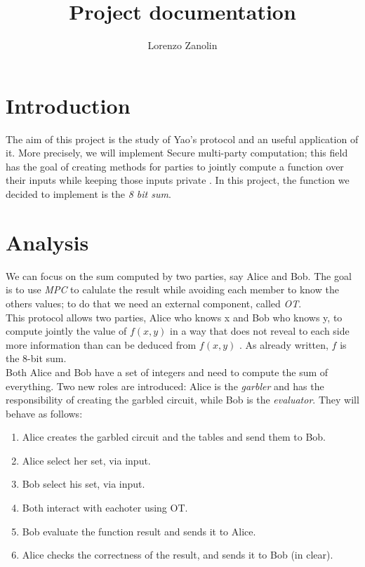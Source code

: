 \documentclass[12pt]{article}
\title{Project documentation}
\author{Lorenzo Zanolin}
\begin{document}
\maketitle

\section{Introduction}
The aim of this project is the study of Yao's protocol \cite{yao} and an useful application of it. More precisely, we will implement Secure multi-party computation; this field has the goal of creating methods for parties to jointly compute a function over their inputs while keeping those inputs private \cite{mpc}. In this project, the function we decided to implement is the \textit{8 bit sum}.

\section{Analysis}
We can focus on the sum computed by two parties, say Alice and Bob. The goal is to use \textit{MPC} to calulate the result while avoiding each member to know the others values; to do that we need an external component, called \textit{OT}.\\ This protocol allows two parties, Alice who
knows x and Bob who knows y, to compute jointly the value of $f(x, y)$ in a way that does not reveal to each side more information than can be deduced from $f(x, y)$ \cite{ot}. As already written, $f$ is the 8-bit sum.\\ Both Alice and Bob have a set of integers and need to compute the sum of everything.
Two new roles are introduced: Alice is the \textit{garbler} and has the responsibility of creating the garbled circuit, while Bob is the \textit{evaluator}.
They will behave as follows:
\begin{enumerate}
    \item Alice creates the garbled circuit and the tables and send them to Bob.
    \item Alice select her set, via input.
    \item Bob select his set, via input.
    \item Both interact with eachoter using OT.
    \item Bob evaluate the function result and sends it to Alice.
    \item Alice checks the correctness of the result, and sends it to Bob (in clear).
\end{enumerate}
\end{document}

